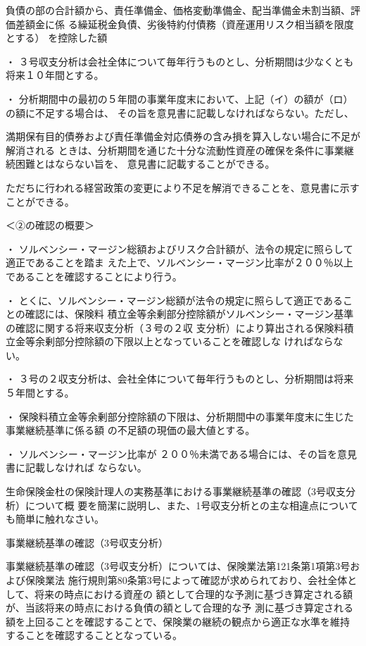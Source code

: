 \documentclass[report,gutter=10mm,fore-edge=10mm,uplatex,dvipdfmx]{jlreq}
\begin{document}
負債の部の合計額から、責任準備金、価格変動準備金、配当準備金未割当額、評価差額金に係
る繰延税金負債、劣後特約付債務（資産運用リスク相当額を限度とする） を控除した額

・ ３号収支分析は会社全体について毎年行うものとし、分析期間は少なくとも将来１０年間とする。

・ 分析期間中の最初の５年間の事業年度末において、上記（イ）の額が（ロ）の額に不足する場合は、
その旨を意見書に記載しなければならない。ただし、


満期保有目的債券および責任準備金対応債券の含み損を算入しない場合に不足が解消される
ときは、分析期間を通じた十分な流動性資産の確保を条件に事業継続困難とはならない旨を、
意見書に記載することができる。


ただちに行われる経営政策の変更により不足を解消できることを、意見書に示すことができる。

＜②の確認の概要＞

・ ソルベンシー・マージン総額およびリスク合計額が、法令の規定に照らして適正であることを踏ま
えた上で、ソルベンシー・マージン比率が２００％以上であることを確認することにより行う。

・ とくに、ソルベンシー・マージン総額が法令の規定に照らして適正であることの確認には、保険料
積立金等余剰部分控除額がソルベンシー・マージン基準の確認に関する将来収支分析（３号の２収
支分析）により算出される保険料積立金等余剰部分控除額の下限以上となっていることを確認しな
ければならない。

・ ３号の２収支分析は、会社全体について毎年行うものとし、分析期間は将来５年間とする。

・ 保険料積立金等余剰部分控除額の下限は、分析期間中の事業年度末に生じた事業継続基準に係る額
の不足額の現価の最大値とする。

・ ソルベンシー・マージン比率が ２００％未満である場合には、その旨を意見書に記載しなければ
ならない。

生命保険金杜の保険計理人の実務基準における事業継続基準の確認（3号収支分析）について概
要を簡潔に説明し、また、1号収支分析との主な相違点についても簡単に触れなさい。

\answer{}
事業継続基準の確認（3号収支分析）

事業継続基準の確認（3号収支分析）については、保険業法第121条第1項第3号および保険業法
施行規則第80条第3号によって確認が求められており、会社全体として、将来の時点における資産の
額として合理的な予測に基づき算定される額が、当該将来の時点における負債の額として合理的な予
測に基づき算定される額を上回ることを確認することで、保険業の継続の観点から適正な水準を維持
することを確認することとなっている。
\end{document}
